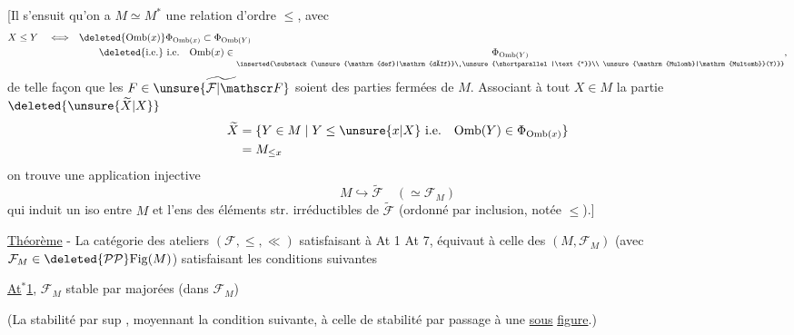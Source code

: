 [Il s'ensuit qu'on a  $M\simeq M^{*}$ une relation d'ordre $\leq$, avec
\[
\begin{aligned}
 X\leq Y\quad\Longleftrightarrow\quad&
 \deleted{\mathrm{Omb}(x)}\Phi_{\mathrm{Omb}(x)}
 \subset\Phi_{\mathrm{Omb}(Y)}\\
 &\qquad\deleted{\text{i.e.}}\ \text{i.e.}\quad
 \mathrm{Omb}(x)\in
 \underset{\inserted{\substack{\unsure{\mathrm{def}|\mathrm{déf}}\ \unsure{\shortparallel|\text{''}}\\
 \unsure{\mathrm{Mulomb}|\mathrm{Multomb}}(Y)}}}{\Phi_{\mathrm{Omb}(Y)}},
\end{aligned}
\]
de telle façon que les  $F\in\widetilde{\unsure{\mathcal F|\mathscr F}}$ soient des parties fermées de $M$.
Associant à tout $X\in M$ la partie $\deleted{\unsure{\widetilde X|X}}$
\[
\begin{aligned}
 \widetilde X&=\{Y\in M\mid Y\leq\unsure{x|X}\ \text{i.e.}\quad
 \mathrm{Omb}(Y)\in\Phi_{\mathrm{Omb}(x)}\}\\
 &=M_{\leq x}
\end{aligned}
\]
on trouve une application injective
\[
 M\hookrightarrow\widetilde{\mathcal F}\quad(\simeq\mathcal F_M)
\]
qui induit un iso entre $M$ et l'ens des éléments str. irréductibles de $\widetilde{\mathcal F}$ (ordonné par inclusion, notée $\leq$).]


\uline{Théorème} - \quad La catégorie  des  ateliers $(\mathcal F,\leq,\ll)$ satisfaisant à At 1  At 7, équivaut à celle des $(M,\mathcal F_M)$ (avec $\mathcal F_M\in\deleted{\mathcal P\mathcal P}\mathrm{Fig}(M)$) satisfaisant les conditions suivantes

\uline{At$^{*}$1}, $\mathcal F_M$   stable par   majorées (dans $\mathcal F_M$)

 (La stabilité par sup , moyennant la condition suivante, à celle de  stabilité par passage à une \uline{sous}  \uline{figure}.)
